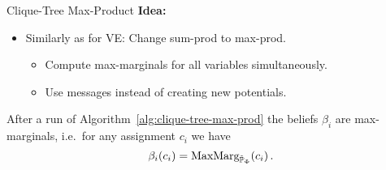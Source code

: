 \begin{frame}{Clique-Tree Max-Product}
    \textbf{Idea:}
    \begin{itemize}
        \item Similarly as for VE: Change sum-prod to max-prod.
        \begin{itemize}
            \pause \item Compute max-marginals for all variables simultaneously.
            \pause \item Use messages instead of creating new potentials.
        \end{itemize} 
    \end{itemize}

    \begin{algorithm}[H]
        \label{alg:clique-tree-max-prod}
        \caption{Upward Pass Clique Tree VE}
        \pause
        \pause
        \end{algorithm}
        \pause
        \begin{proposition}
            After a run of Algorithm~\ref{alg:clique-tree-max-prod} the beliefs $\beta_i$ are max-marginals, i.e.\ for any assignment $c_i$ we have
            \begin{equation}
                \beta_i(c_i) = \maxmarg_{\tilde{\Pb}_{\Phi}}(c_i)\,.
            \end{equation}
        \end{proposition}
\end{frame}


